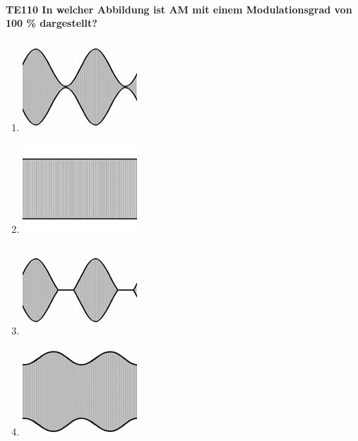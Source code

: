 \documentclass[8pt]{article}
\begin{document}
\begin{enumerate}
\begin{enumerate}[nolistsep,label=\Alph*]
\paragraph*{TE110 In welcher Abbildung ist AM mit einem Modulationsgrad von 100 \% dargestellt?}
\begin{enumerate}[nolistsep,label=\Alph*]
\item
\begin{center}
	\begin{minipage}{\linewidth}
		\centering
		\includegraphics[scale=1.0]{pics/te110_a.jpg}
	\end{minipage}
\end{center}
\item
\begin{center}
	\begin{minipage}{\linewidth}
		\centering
		\includegraphics[scale=1.0]{pics/te110_b.jpg}
	\end{minipage}
\end{center}
\item
\begin{center}
	\begin{minipage}{\linewidth}
		\centering
		\includegraphics[scale=1.0]{pics/te110_c.jpg}
	\end{minipage}
\end{center}
\item
\begin{center}
	\begin{minipage}{\linewidth}
		\centering
		\includegraphics[scale=1.0]{pics/te110_d.jpg}
	\end{minipage}
\end{center}
\end{enumerate}


\end{enumerate}
\end{enumerate}
\end{document}
